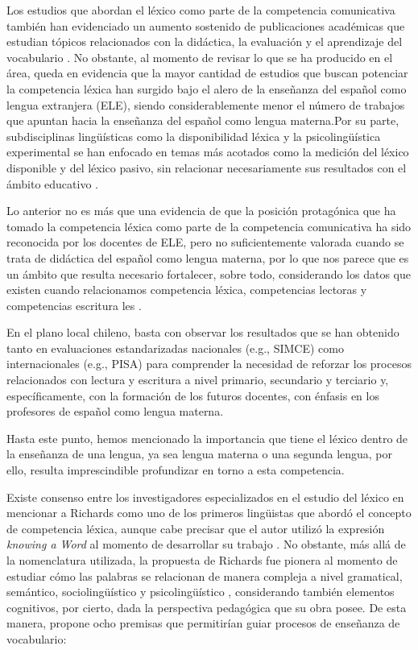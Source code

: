 \documentclass{textolivre-html}
\begin{document}
Los estudios que abordan el léxico como parte de la competencia
comunicativa también han evidenciado un aumento sostenido de publicaciones
académicas que estudian tópicos relacionados con la didáctica, la evaluación y
el aprendizaje del vocabulario \cite{perfetti2001,rufat2016}. No
obstante, al momento de revisar lo que se ha producido en el área, queda en
evidencia que la mayor cantidad de estudios que buscan potenciar la competencia
léxica han surgido bajo el alero de la enseñanza del español como lengua
extranjera (ELE), siendo considerablemente menor el número de trabajos que
apuntan hacia la enseñanza del español como lengua materna.Por su parte,
subdisciplinas lingüísticas como la disponibilidad léxica y la
psicolingüística experimental se han enfocado en temas más acotados como la
medición del léxico disponible y del léxico pasivo, sin relacionar
necesariamente sus resultados con el ámbito educativo \cite{GermanyG2000,echeverria1987,RiffoOcares2014}.

Lo anterior no es más que una evidencia de que la posición protagónica que
ha tomado la competencia léxica como parte de la competencia comunicativa ha
sido reconocida por los docentes de ELE, pero no suficientemente valorada cuando
se trata de didáctica del español como lengua materna, por lo que nos parece que
es un ámbito que resulta necesario fortalecer, sobre todo, considerando los
datos que existen cuando relacionamos competencia léxica, competencias lectoras
y competencias escritura les \cite{GonzaloZapico2016,Zapico2017,kaur,Pinto2019}.

En el plano local chileno, basta con observar los resultados que se han
obtenido tanto en evaluaciones estandarizadas nacionales (e.g., SIMCE) como
internacionales (e.g., PISA) \cite{VillarroelHenrquez2015,FigueroaSeplveda2018}
para comprender la necesidad de reforzar los procesos relacionados
con lectura y escritura a nivel primario, secundario y terciario y,
específicamente, con la formación de los futuros docentes, con énfasis en los
profesores de español como lengua materna.

Hasta este punto, hemos mencionado la importancia que tiene el léxico dentro de
la enseñanza de una lengua, ya sea lengua materna o una segunda lengua, por
ello, resulta imprescindible profundizar en torno a esta competencia.

Existe consenso entre los investigadores especializados en el estudio del
léxico en mencionar a Richards como uno de los primeros lingüistas que abordó
el concepto de competencia léxica, aunque cabe precisar que el autor utilizó la
expresión \textit{knowing a Word} al momento de desarrollar su trabajo \cite{Richards1976,Choudhury2015,Velsquez2016}.
No obstante, más allá de la nomenclatura
utilizada, la propuesta de Richards fue pionera al momento de estudiar cómo las
palabras se relacionan de manera compleja a nivel gramatical, semántico,
sociolingüístico y psicolingüístico \cite{catalan2002}, considerando
también elementos cognitivos, por cierto, dada la perspectiva pedagógica que su
obra posee. De esta manera, \textcite[p. 78--83]{Richards1976} propone ocho premisas que
permitirían guiar procesos de enseñanza de vocabulario:
\end{document}
